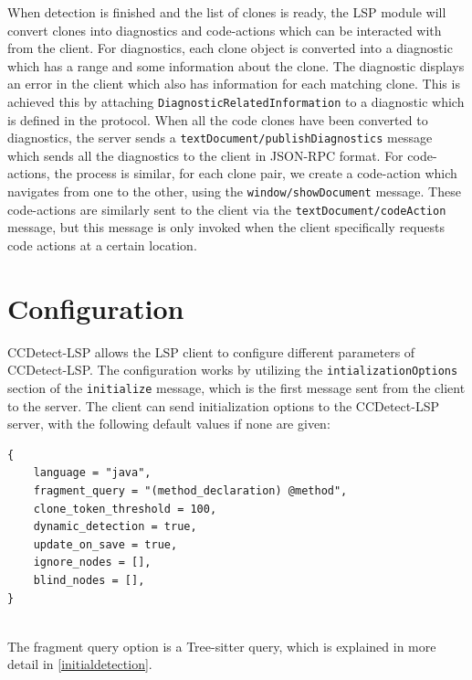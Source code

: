 When detection is finished and the list of clones is ready, the LSP module will convert
clones into diagnostics and code-actions which can be interacted with from the client. For
diagnostics, each clone object is converted into a diagnostic which has a range and some
information about the clone. The diagnostic displays an error in the client which also has
information for each matching clone. This is achieved this by attaching
\verb|DiagnosticRelatedInformation| to a diagnostic which is defined in the protocol. When
all the code clones have been converted to diagnostics, the server sends a
\verb|textDocument/publishDiagnostics| message which sends all the diagnostics to the
client in JSON-RPC format. For code-actions, the process is similar, for each clone pair,
we create a code-action which navigates from one to the other, using the
\verb|window/showDocument| message. These code-actions are similarly sent to the client
via the \verb|textDocument/codeAction| message, but this message is only invoked when the
client specifically requests code actions at a certain location.

\section{Configuration}
\label{configuration}

CCDetect-LSP allows the LSP client to configure different parameters of CCDetect-LSP. The
configuration works by utilizing the \verb|intializationOptions| section of the
\verb|initialize| message, which is the first message sent from the client to the server.
The client can send initialization options to the CCDetect-LSP server, with the following
default values if none are given:

\begin{lstlisting}
{
    language = "java",
    fragment_query = "(method_declaration) @method",
    clone_token_threshold = 100,
    dynamic_detection = true,
    update_on_save = true,
    ignore_nodes = [],
    blind_nodes = [],
}


\end{lstlisting}

The fragment query option is a Tree-sitter query, which is explained in more detail in
\cref{initialdetection}.
